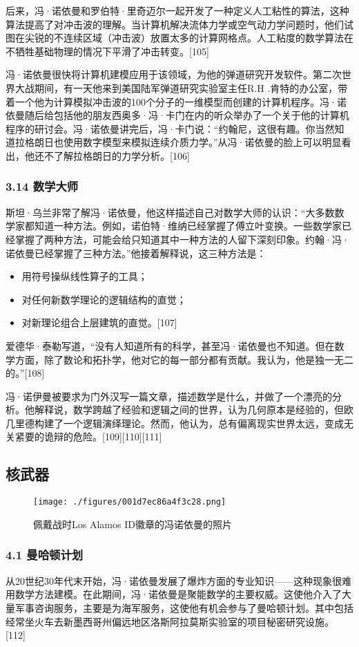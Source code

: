 后来，冯·诺依曼和罗伯特·里奇迈尔一起开发了一种定义人工粘性的算法，这种算法提高了对冲击波的理解。当计算机解决流体力学或空气动力学问题时，他们试图在尖锐的不连续区域（冲击波）放置太多的计算网格点。人工粘度的数学算法在不牺牲基础物理的情况下平滑了冲击转变。[105]

冯·诺依曼很快将计算机建模应用于该领域，为他的弹道研究开发软件。第二次世界大战期间，有一天他来到美国陆军弹道研究实验室主任R.H .肯特的办公室，带着一个他为计算模拟冲击波的100个分子的一维模型而创建的计算机程序。冯·诺依曼随后给包括他的朋友西奥多·冯·卡门在内的听众举办了一个关于他的计算机程序的研讨会。冯·诺依曼讲完后，冯·卡门说：“约翰尼，这很有趣。你当然知道拉格朗日也使用数字模型来模拟连续介质力学。”从冯·诺依曼的脸上可以明显看出，他还不了解拉格朗日的力学分析。[106]
\subsubsection{3.14 数学大师}
斯坦·乌兰非常了解冯·诺依曼，他这样描述自己对数学大师的认识：“大多数数学家都知道一种方法。例如，诺伯特·维纳已经掌握了傅立叶变换。一些数学家已经掌握了两种方法，可能会给只知道其中一种方法的人留下深刻印象。约翰·冯·诺依曼已经掌握了三种方法。”他接着解释说，这三种方法是：
\begin{itemize}
\item 用符号操纵线性算子的工具；
\item 对任何新数学理论的逻辑结构的直觉；
\item 对新理论组合上层建筑的直觉。[107]
\end{itemize}
爱德华·泰勒写道，“没有人知道所有的科学，甚至冯·诺依曼也不知道。但在数学方面，除了数论和拓扑学，他对它的每一部分都有贡献。我认为，他是独一无二的。”[108]

冯·诺伊曼被要求为门外汉写一篇文章，描述数学是什么，并做了一个漂亮的分析。他解释说，数学跨越了经验和逻辑之间的世界，认为几何原本是经验的，但欧几里德构建了一个逻辑演绎理论。然而，他认为，总有偏离现实世界太远，变成无关紧要的诡辩的危险。[109][110][111]

\subsection{核武器}
\begin{figure}[ht]
\centering
\texttt{[image: ./figures/001d7ec86a4f3c28.png]}
\caption{佩戴战时Los Alamos ID徽章的冯诺依曼的照片} \label{fig_von_6}
\end{figure}
\subsubsection{4.1 曼哈顿计划}
从20世纪30年代末开始，冯·诺依曼发展了爆炸方面的专业知识——这种现象很难用数学方法建模。在此期间，冯·诺依曼是聚能数学的主要权威。这使他介入了大量军事咨询服务，主要是为海军服务，这使他有机会参与了曼哈顿计划。其中包括经常坐火车去新墨西哥州偏远地区洛斯阿拉莫斯实验室的项目秘密研究设施。[112]

